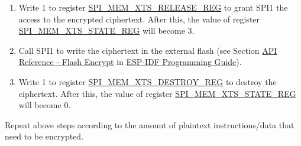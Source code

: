 \documentclass[main\_\_EN.tex]{subfiles}
\begin{document}
\begin{enumerate}
    \item Write 1 to register \hyperref[regdesc:SPIMEMXTSRELEASEREG]{SPI\_MEM\_XTS\_RELEASE\_REG} to grant SPI1 the access to the encrypted ciphertext. After this, the value of register \hyperref[regdesc:SPIMEMXTSSTATEREG]{SPI\_MEM\_XTS\_STATE\_REG} will become 3. 
    
    \item Call SPI1 to write the ciphertext in the external flash (see Section \href{https://docs.espressif.com/projects/esp-idf/en/latest/esp32c6/api-reference/peripherals/spi_flash/index.html#api-reference-flash-encrypt}{API Reference - Flash Encrypt} in \href{https://docs.espressif.com/projects/esp-idf/en/latest/esp32h2/index.html}{ESP-IDF Programming Guide}).
    
    \item Write 1 to register \hyperref[regdesc:SPIMEMXTSDESTROYREG]{SPI\_MEM\_XTS\_DESTROY\_REG} to destroy the ciphertext. After this, the value of register \hyperref[regdesc:SPIMEMXTSSTATEREG]{SPI\_MEM\_XTS\_STATE\_REG} will become 0.
    
\end{enumerate}

Repeat above steps according to the amount of plaintext instructions/data that need to be encrypted.
\end{document}
